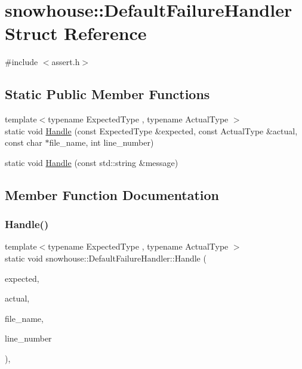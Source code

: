 \hypertarget{structsnowhouse_1_1DefaultFailureHandler}{}\section{snowhouse\+::Default\+Failure\+Handler Struct Reference}
\label{structsnowhouse_1_1DefaultFailureHandler}


{\ttfamily \#include $<$assert.\+h$>$}

\subsection*{Static Public Member Functions}
\begin{DoxyCompactItemize}
\item 
{\footnotesize template$<$typename Expected\+Type , typename Actual\+Type $>$ }\\static void \mbox{\hyperlink{structsnowhouse_1_1DefaultFailureHandler_ad1006c4804575cf45a02f9c05be61ab4}{Handle}} (const Expected\+Type \&expected, const Actual\+Type \&actual, const char $\ast$file\+\_\+name, int line\+\_\+number)
\item 
static void \mbox{\hyperlink{structsnowhouse_1_1DefaultFailureHandler_ad66656c09b4beff2411affb067bef85c}{Handle}} (const std\+::string \&message)
\end{DoxyCompactItemize}


\subsection{Member Function Documentation}
\mbox{\label{structsnowhouse_1_1DefaultFailureHandler_ad1006c4804575cf45a02f9c05be61ab4}} 
\subsubsection{\texorpdfstring{Handle()}{Handle()}\hspace{0.1cm}{\footnotesize\ttfamily [1/2]}}
{\footnotesize\ttfamily template$<$typename Expected\+Type , typename Actual\+Type $>$ \\
static void snowhouse\+::\+Default\+Failure\+Handler\+::\+Handle (\begin{DoxyParamCaption}\item[{const Expected\+Type \&}]{expected,  }\item[{const Actual\+Type \&}]{actual,  }\item[{const char $\ast$}]{file\+\_\+name,  }\item[{int}]{line\+\_\+number }\end{DoxyParamCaption})\hspace{0.3cm}{\ttfamily [inline]}, {\ttfamily [static]}}

